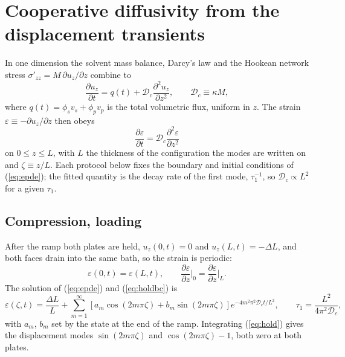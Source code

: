 \documentclass[11pt]{article}
\begin{document}
\section{Cooperative diffusivity from the displacement transients}

In one dimension the solvent mass balance, Darcy's law and the Hookean network stress $\sigma'_{zz} = M\,\partial u_z/\partial z$ combine to
\begin{equation}
\frac{\partial u_z}{\partial t} = q(t) + \mathcal{D}_c \frac{\partial^2 u_z}{\partial z^2}, \qquad \mathcal{D}_c \equiv \kappa M,
\label{eq:upde}
\end{equation}
where $q(t) = \phi_s v_s + \phi_p v_p$ is the total volumetric flux, uniform in $z$. The strain $\varepsilon \equiv -\partial u_z/\partial z$ then obeys
\begin{equation}
\frac{\partial \varepsilon}{\partial t} = \mathcal{D}_c \frac{\partial^2 \varepsilon}{\partial z^2}
\label{eq:epde}
\end{equation}
on $0 \le z \le L$, with $L$ the thickness of the configuration the modes are written on and $\zeta \equiv z/L$. Each protocol below fixes the boundary and initial conditions of (\ref{eq:epde}); the fitted quantity is the decay rate of the first mode, $\tau_1^{-1}$, so $\mathcal{D}_c \propto L^2$ for a given $\tau_1$.

\subsection{Compression, loading}

After the ramp both plates are held, $u_z(0,t) = 0$ and $u_z(L,t) = -\Delta L$, and both faces drain into the same bath, so the strain is periodic:
\begin{equation}
\varepsilon(0,t) = \varepsilon(L,t), \qquad \frac{\partial\varepsilon}{\partial z}\Big|_{0} = \frac{\partial\varepsilon}{\partial z}\Big|_{L}.
\label{eq:holdbc}
\end{equation}
The solution of (\ref{eq:epde}) and (\ref{eq:holdbc}) is
\begin{equation}
\varepsilon(\zeta,t) = \frac{\Delta L}{L} + \sum_{m=1}^{\infty} \left[a_m \cos(2m\pi\zeta) + b_m \sin(2m\pi\zeta)\right] e^{-4m^2\pi^2 \mathcal{D}_c t/L^2},
\qquad \tau_1 = \frac{L^2}{4\pi^2 \mathcal{D}_c},
\label{eq:hold}
\end{equation}
with $a_m$, $b_m$ set by the state at the end of the ramp. Integrating (\ref{eq:hold}) gives the displacement modes $\sin(2m\pi\zeta)$ and $\cos(2m\pi\zeta) - 1$, both zero at both plates.
\end{document}
